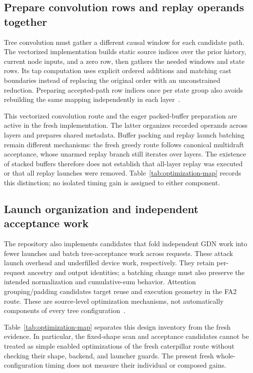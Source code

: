 \documentclass[conference]{IEEEtran}
\begin{document}
\subsection{Prepare convolution rows and replay operands together}
Tree convolution must gather a different causal window for each candidate path. The vectorized implementation builds static source indices over the prior history, current node inputs, and a zero row, then gathers the needed windows and state rows. Its tap computation uses explicit ordered additions and matching cast boundaries instead of replacing the original order with an unconstrained reduction. Preparing accepted-path row indices once per state group also avoids rebuilding the same mapping independently in each layer~\cite{lumo2026archive}.

This vectorized convolution route and the eager packed-buffer preparation are active in the fresh implementation. The latter organizes recorded operands across layers and prepares shared metadata. Buffer packing and replay launch batching remain different mechanisms: the fresh greedy route follows canonical multidraft acceptance, whose unarmed replay branch still iterates over layers. The existence of stacked buffers therefore does not establish that all-layer replay was executed or that all replay launches were removed. Table~\ref{tab:optimization-map} records this distinction; no isolated timing gain is assigned to either component.

\subsection{Launch organization and independent acceptance work}
The repository also implements candidates that fold independent GDN work into fewer launches and batch tree-acceptance work across requests. These attack launch overhead and underfilled device work, respectively. They retain per-request ancestry and output identities; a batching change must also preserve the intended normalization and cumulative-sum behavior. Attention grouping/padding candidates target reuse and execution geometry in the FA2 route. These are source-level optimization mechanisms, not automatically components of every tree configuration~\cite{lumo2026archive}.

Table~\ref{tab:optimization-map} separates this design inventory from the fresh evidence. In particular, the fixed-shape scan and acceptance candidates cannot be treated as simple enabled optimizations of the fresh caterpillar route without checking their shape, backend, and launcher guards. The present fresh whole-configuration timing does not measure their individual or composed gains.
\end{document}
